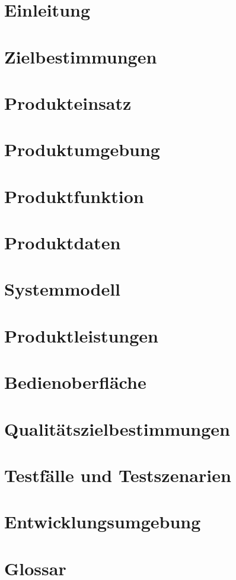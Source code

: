 

	\maketitle
	\tableofcontents
	\chapter{Einleitung}
		
	\chapter{Zielbestimmungen}
		
	\chapter{Produkteinsatz}
		
	\chapter{Produktumgebung}
		
	\chapter{Produktfunktion}
		
	\chapter{Produktdaten}
		
	\chapter{Systemmodell}
		
	\chapter{Produktleistungen}
		
	\chapter{Bedienoberfläche}
		
	\chapter{Qualitätszielbestimmungen}
		
	\chapter{Testfälle und Testszenarien}
		
	\chapter{Entwicklungsumgebung}
		
	\chapter{Glossar}
		

